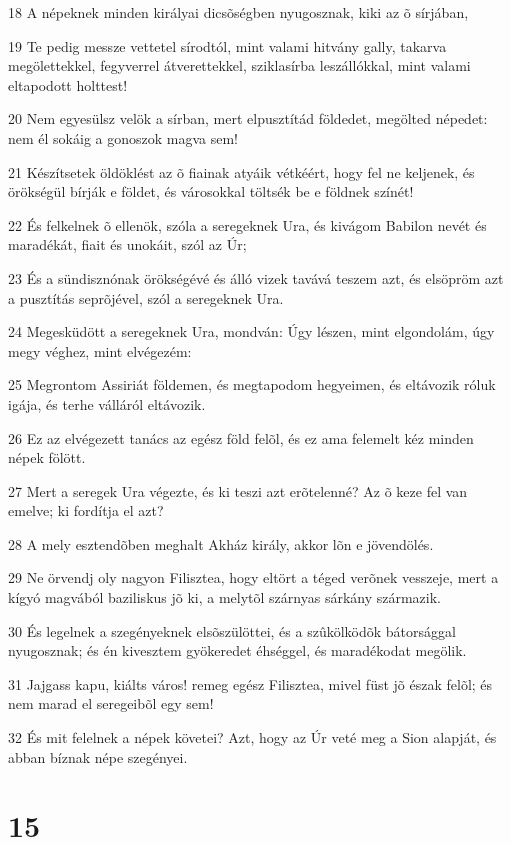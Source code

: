 \par 18 A népeknek minden királyai dicsõségben nyugosznak, kiki az õ sírjában,
\par 19 Te pedig messze vettetel sírodtól, mint valami hitvány gally, takarva megölettekkel, fegyverrel átverettekkel, sziklasírba leszállókkal, mint valami eltapodott holttest!
\par 20 Nem egyesülsz velök a sírban, mert elpusztítád földedet, megölted népedet: nem él sokáig a gonoszok magva sem!
\par 21 Készítsetek öldöklést az õ fiainak atyáik vétkéért, hogy fel ne keljenek, és örökségül bírják e földet, és városokkal töltsék be e földnek színét!
\par 22 És felkelnek õ ellenök, szóla a seregeknek Ura, és kivágom Babilon nevét és maradékát, fiait és unokáit, szól az Úr;
\par 23 És a sündisznónak örökségévé és álló vizek tavává teszem azt, és elsöpröm azt a pusztítás seprõjével, szól a seregeknek Ura.
\par 24 Megesküdött a seregeknek Ura, mondván: Úgy lészen, mint elgondolám, úgy megy véghez, mint elvégezém:
\par 25 Megrontom Assiriát földemen, és megtapodom hegyeimen, és eltávozik róluk igája, és terhe válláról eltávozik.
\par 26 Ez az elvégezett tanács az egész föld felõl, és ez ama felemelt kéz minden népek fölött.
\par 27 Mert a seregek Ura végezte, és ki teszi azt erõtelenné? Az õ keze fel van emelve; ki fordítja el azt?
\par 28 A mely esztendõben meghalt Akház király, akkor lõn e jövendölés.
\par 29 Ne örvendj oly nagyon Filisztea, hogy eltört a téged verõnek vesszeje, mert a kígyó magvából baziliskus jõ ki, a melytõl szárnyas sárkány származik.
\par 30 És legelnek a szegényeknek elsõszülöttei, és a szûkölködõk bátorsággal nyugosznak; és én kivesztem gyökeredet éhséggel, és maradékodat megölik.
\par 31 Jajgass kapu, kiálts város! remeg egész Filisztea, mivel füst jõ észak felõl; és nem marad el seregeibõl egy sem!
\par 32 És mit felelnek a népek követei? Azt, hogy az Úr veté meg a Sion alapját, és abban bíznak népe szegényei.

\chapter{15}

